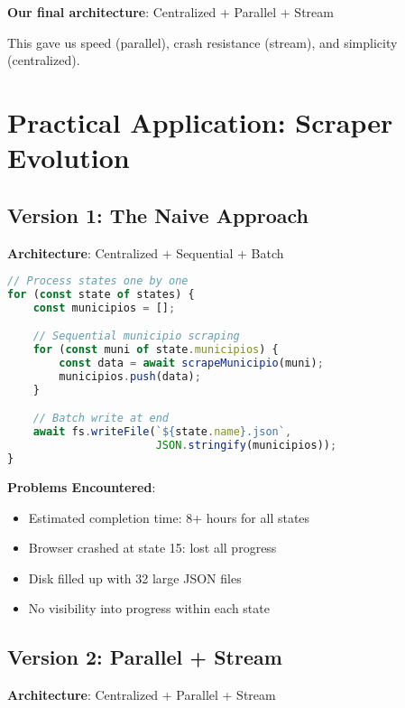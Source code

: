 \documentclass[11pt,a4paper]{article}
\begin{document}
\textbf{Our final architecture}: Centralized + Parallel + Stream

This gave us speed (parallel), crash resistance (stream), and simplicity (centralized).

\section{Practical Application: Scraper Evolution}

\subsection{Version 1: The Naive Approach}

\textbf{Architecture}: Centralized + Sequential + Batch

\begin{lstlisting}[language=JavaScript,caption={First iteration}]
// Process states one by one
for (const state of states) {
    const municipios = [];

    // Sequential municipio scraping
    for (const muni of state.municipios) {
        const data = await scrapeMunicipio(muni);
        municipios.push(data);
    }

    // Batch write at end
    await fs.writeFile(`${state.name}.json`,
                       JSON.stringify(municipios));
}
\end{lstlisting}

\textbf{Problems Encountered}:
\begin{itemize}
    \item Estimated completion time: 8+ hours for all states
    \item Browser crashed at state 15: lost all progress
    \item Disk filled up with 32 large JSON files
    \item No visibility into progress within each state
\end{itemize}

\subsection{Version 2: Parallel + Stream}

\textbf{Architecture}: Centralized + Parallel + Stream
\end{document}
